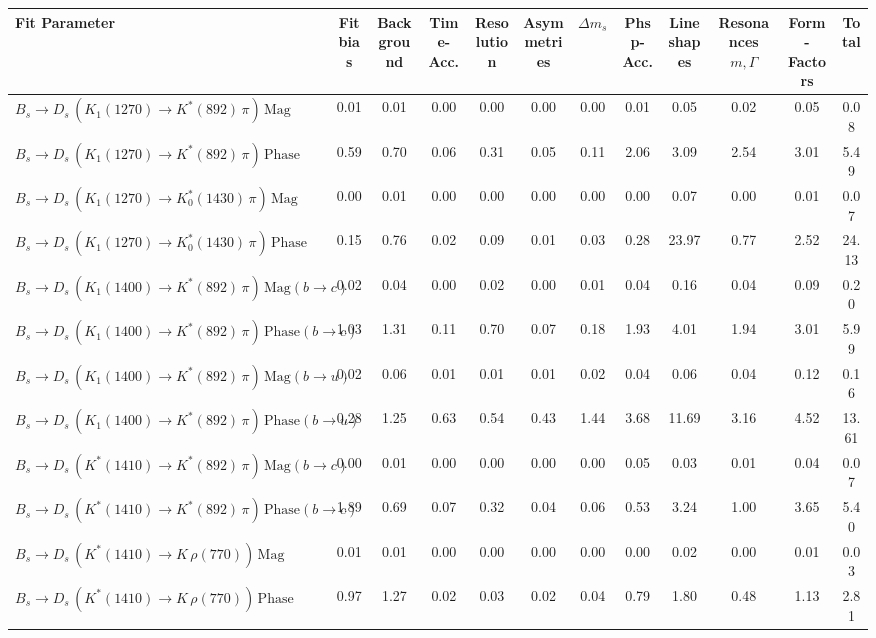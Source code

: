 \begin{tabular}{l  c  c  c  c  c  c  c  c  c  c  | c }
\hline
\hline
Fit Parameter & Fit bias & Background & Time-Acc. & Resolution & Asymmetries & $\Delta m_{s}$ & Phsp-Acc. & Lineshapes & Resonances $m,\Gamma$ & Form-Factors &  Total  \\ 
\hline
$B_s \to D_s \, ( K_1(1270) \to K^{*}(892) \, \pi ) \, \text{Mag}$ & 0.01 & 0.01 & 0.00 & 0.00 & 0.00 & 0.00 & 0.01 & 0.05 & 0.02 & 0.05 & 0.08 \\ 
$B_s \to D_s \, ( K_1(1270) \to K^{*}(892) \, \pi ) \, \text{Phase}$ & 0.59 & 0.70 & 0.06 & 0.31 & 0.05 & 0.11 & 2.06 & 3.09 & 2.54 & 3.01 & 5.49 \\ 
$B_s \to D_s \, ( K_1(1270) \to K^{*}_{0}(1430) \, \pi ) \, \text{Mag} $ & 0.00 & 0.01 & 0.00 & 0.00 & 0.00 & 0.00 & 0.00 & 0.07 & 0.00 & 0.01 & 0.07 \\ 
$B_s \to D_s \, ( K_1(1270) \to K^{*}_{0}(1430) \, \pi ) \, \text{Phase} $ & 0.15 & 0.76 & 0.02 & 0.09 & 0.01 & 0.03 & 0.28 & 23.97 & 0.77 & 2.52 & 24.13 \\ 
$B_s \to D_s \, ( K_1(1400) \to K^{*}(892) \, \pi ) \, \text{Mag} (b \to c)$ & 0.02 & 0.04 & 0.00 & 0.02 & 0.00 & 0.01 & 0.04 & 0.16 & 0.04 & 0.09 & 0.20 \\ 
$B_s \to D_s \, ( K_1(1400) \to K^{*}(892) \, \pi ) \, \text{Phase} (b \to c)$ & 1.03 & 1.31 & 0.11 & 0.70 & 0.07 & 0.18 & 1.93 & 4.01 & 1.94 & 3.01 & 5.99 \\ 
$B_s \to D_s \, ( K_1(1400) \to K^{*}(892) \, \pi ) \, \text{Mag} (b \to u)$ & 0.02 & 0.06 & 0.01 & 0.01 & 0.01 & 0.02 & 0.04 & 0.06 & 0.04 & 0.12 & 0.16 \\ 
$B_s \to D_s \, ( K_1(1400) \to K^{*}(892) \, \pi ) \, \text{Phase} (b \to u)$ & 0.28 & 1.25 & 0.63 & 0.54 & 0.43 & 1.44 & 3.68 & 11.69 & 3.16 & 4.52 & 13.61 \\ 
$B_s \to D_s \, ( K^{*}(1410) \to K^{*}(892) \, \pi ) \, \text{Mag} (b \to c)$ & 0.00 & 0.01 & 0.00 & 0.00 & 0.00 & 0.00 & 0.05 & 0.03 & 0.01 & 0.04 & 0.07 \\ 
$B_s \to D_s \, ( K^{*}(1410) \to K^{*}(892) \, \pi ) \, \text{Phase} (b \to c)$ & 1.89 & 0.69 & 0.07 & 0.32 & 0.04 & 0.06 & 0.53 & 3.24 & 1.00 & 3.65 & 5.40 \\ 
$B_s \to D_s \, ( K^{*}(1410) \to K \, \rho(770) ) \, \text{Mag}$ & 0.01 & 0.01 & 0.00 & 0.00 & 0.00 & 0.00 & 0.00 & 0.02 & 0.00 & 0.01 & 0.03 \\ 
$B_s \to D_s \, ( K^{*}(1410) \to K \, \rho(770) ) \, \text{Phase}$ & 0.97 & 1.27 & 0.02 & 0.03 & 0.02 & 0.04 & 0.79 & 1.80 & 0.48 & 1.13 & 2.81 \\ 

\end{tabular}
